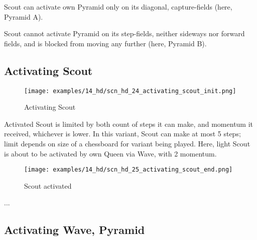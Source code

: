 \vspace*{-0.5\baselineskip}
Scout can activate own Pyramid only on its diagonal, capture-fields (here, Pyramid A).

Scout cannot activate Pyramid on its step-fields, neither sideways nor forward fields,
and is blocked from moving any further (here, Pyramid B).

\clearpage %

\subsection*{Activating Scout}
\label{sec:Hemera's Dawn/Scout/Activating Scout}

\vspace*{-1.3\baselineskip}
\noindent
\begin{figure}[!h]
\texttt{[image: examples/14\_hd/scn\_hd\_24\_activating\_scout\_init.png]}
\vspace*{-1.3\baselineskip}
\caption{Activating Scout}
\label{fig:scn_hd_24_activating_scout_init}
\end{figure}

\vspace*{-0.5\baselineskip}
Activated Scout is limited by both count of steps it can make, and momentum it
received, whichever is lower. In this variant, Scout can make at most 5 steps;
limit depends on size of a chessboard for variant being played.\newline
\indent
Here, light Scout is about to be activated by own Queen via Wave, with 2 momentum.

\vspace*{-0.7\baselineskip}
\noindent
\begin{figure}[!h]
\texttt{[image: examples/14\_hd/scn\_hd\_25\_activating\_scout\_end.png]}
\vspace*{-1.3\baselineskip}
\caption{Scout activated}
\label{fig:scn_hd_25_activating_scout_end}
\end{figure}

\vspace*{-0.5\baselineskip}
...

\clearpage %

\subsection*{Activating Wave, Pyramid}
\label{sec:Hemera's Dawn/Scout/Activating Wave, Pyramid}

